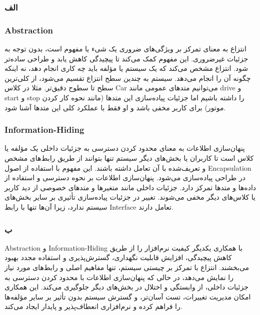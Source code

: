 \subsubsection*{الف}
\subsubsection*{Abstraction}
انتزاع به معنای تمرکز بر ویژگی‌های ضروری یک شیء یا مفهوم است، بدون توجه به جزئیات غیرضروری. این مفهوم کمک می‌کند تا پیچیدگی کاهش یابد و طراحی ساده‌تر شود.
انتزاع مشخص می‌کند که یک سیستم یا مؤلفه باید چه کاری انجام دهد، نه اینکه چگونه آن را انجام می‌دهد.
سیستم به چندین سطح انتزاع تقسیم می‌شود، از کلی‌ترین سطح تا سطوح دقیق‌تر.
مثلا در کلاس Car می‌توانیم متدهای عمومی مانند drive و start و stop را داشته باشیم اما جزئیات پیاده‌سازی این متدها (مانند نحوه کار کردن موتور) برای کاربر مخفی باشد و او فقط با عملکرد کلی این متدها آشنا شود.

\subsubsection*{Information-Hiding}
پنهان‌سازی اطلاعات به معنای محدود کردن دسترسی به جزئیات داخلی یک مؤلفه یا کلاس است تا کاربران یا بخش‌های دیگر سیستم تنها بتوانند از طریق رابط‌های مشخص و تعریف‌شده با آن تعامل داشته باشند. این مفهوم با استفاده از اصول Encapsulation در طراحی پیاده‌سازی می‌شود. پنهان‌سازی اطلاعات بر نحوه دسترسی و استفاده از داده‌ها و متدها تمرکز دارد. جزئیات داخلی مانند متغیرها و متدهای خصوصی از دید کاربر یا کلاس‌های دیگر مخفی می‌شوند. تغییر در جزئیات پیاده‌سازی تأثیری بر سایر بخش‌های سیستم ندارد، زیرا آن‌ها تنها با رابط Interface تعامل دارند.
\subsubsection*{ب}

Abstraction و Information-Hiding با همکاری یکدیگر کیفیت نرم‌افزار را از طریق کاهش پیچیدگی، افزایش قابلیت نگهداری، گسترش‌پذیری و استفاده مجدد بهبود می‌بخشند. انتزاع با تمرکز بر چیستی سیستم، تنها مفاهیم اصلی و رابط‌های مورد نیاز را نمایش می‌دهد، در حالی که پنهان‌سازی اطلاعات با محدود کردن دسترسی به جزئیات داخلی، از وابستگی و اختلال در بخش‌های دیگر جلوگیری می‌کند. این همکاری امکان مدیریت تغییرات، تست آسان‌تر، و گسترش سیستم بدون تأثیر بر سایر مؤلفه‌ها را فراهم کرده و نرم‌افزاری انعطاف‌پذیر و پایدار ایجاد می‌کند.